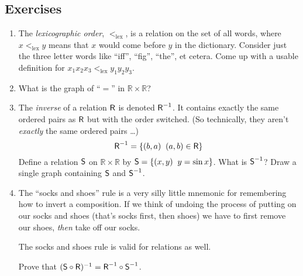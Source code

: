 \documentclass[10pt,]{book}
\theoremstyle{plain}
\theoremstyle{definition}
\theoremstyle{definition}
\numberwithin{equation}{section}
\newcommand{\suchthat}{\;  \;}
\newcommand{\Reals}{{\mathbb R}}
\newcommand{\relR}{\mbox{\textsf R}}
\newcommand{\relS}{\mbox{\textsf S}}
\newcommand{\lt}{ < }
\begin{document}
\subsection[{Exercises}]{Exercises}\label{exercises-30}
\leavevmode%
\begin{enumerate}[label=(\alph*)]
\item\hypertarget{li-394}{}
          The \emph{lexicographic order}, 
          \(\lt _{\mbox{lex} }\), is a relation on the
          set of all words, where \(x \lt _{\mbox{lex} } y\) means that \(x\) would come before
          \(y\) in the dictionary.  Consider just the three letter words like ``iff'',
          ``fig'', ``the'', et cetera.  Come up with a usable definition for
          \(x_1x_2x_3  \lt _{\mbox{lex} } y_1y_2y_3\).
\item\hypertarget{li-395}{}
          What is the graph of ``\(=\)'' in \(\Reals \times \Reals\)?
\item\hypertarget{li-396}{}
          The  \emph{inverse} of a relation \(\relR\)
          is denoted \(\relR^{-1}\).  It contains exactly the same ordered pairs
          as \(\relR\) but with the order switched.  (So technically, they aren't
          \emph{exactly} the same ordered pairs \dots{})
          \begin{equation*}
            \relR^{-1} = \{ (b,a) \suchthat (a,b) \in \relR \}
          \end{equation*}
          Define a relation \(\relS\) on \(\Reals \times \Reals\) by
          \(\relS = \{ (x,y) \suchthat y = \sin x \}\).  What is \(\relS^{-1}\)?
          Draw a single graph containing \(\relS\) and \(\relS^{-1}\).
\item\hypertarget{li-397}{}
          The ``socks and shoes'' rule is a very silly little mnemonic
          for remembering how to invert a composition.  If we think of undoing
          the process of putting on our socks and shoes (that's socks first, then
          shoes) we have to first remove our shoes, \emph{then} take off our socks.

          The socks and shoes rule is valid for relations as well.

          Prove that \((\relS \circ \relR)^{-1} = \relR^{-1} \circ \relS^{-1}\).
\end{enumerate}
\typeout{************************************************}
\typeout{************************************************}
\end{document}
